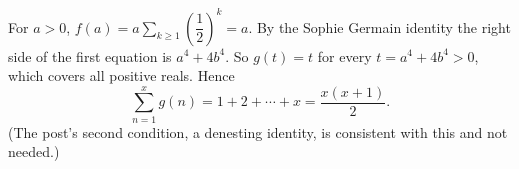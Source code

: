 For $a>0$, $f(a)=a\sum_{k\ge1}\left(\dfrac12\right)^k=a$. By the Sophie Germain identity the right side of the first equation is $a^4+4b^4$. So $g(t)=t$ for every $t=a^4+4b^4>0$, which covers all positive reals. Hence
\[\sum_{n=1}^{x}g(n)=1+2+\cdots+x=\boxed{\dfrac{x(x+1)}{2}}.\]
(The post's second condition, a denesting identity, is consistent with this and not needed.)
